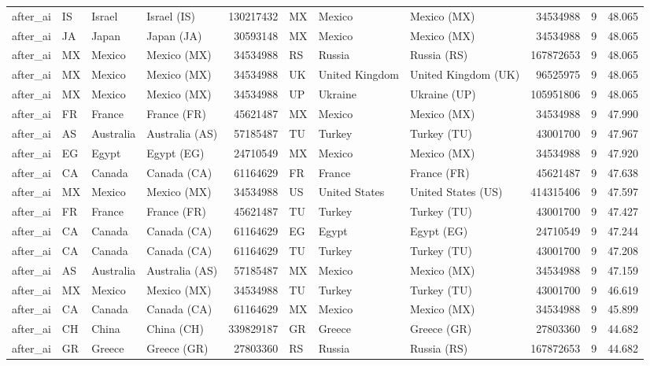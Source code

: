 \begin{tabular}{llllrlllrrr}
after\_ai & IS & Israel & Israel (IS) & 130217432 & MX & Mexico & Mexico (MX) & 34534988 & 9 & 48.065 \\
after\_ai & JA & Japan & Japan (JA) & 30593148 & MX & Mexico & Mexico (MX) & 34534988 & 9 & 48.065 \\
after\_ai & MX & Mexico & Mexico (MX) & 34534988 & RS & Russia & Russia (RS) & 167872653 & 9 & 48.065 \\
after\_ai & MX & Mexico & Mexico (MX) & 34534988 & UK & United Kingdom & United Kingdom (UK) & 96525975 & 9 & 48.065 \\
after\_ai & MX & Mexico & Mexico (MX) & 34534988 & UP & Ukraine & Ukraine (UP) & 105951806 & 9 & 48.065 \\
after\_ai & FR & France & France (FR) & 45621487 & MX & Mexico & Mexico (MX) & 34534988 & 9 & 47.990 \\
after\_ai & AS & Australia & Australia (AS) & 57185487 & TU & Turkey & Turkey (TU) & 43001700 & 9 & 47.967 \\
after\_ai & EG & Egypt & Egypt (EG) & 24710549 & MX & Mexico & Mexico (MX) & 34534988 & 9 & 47.920 \\
after\_ai & CA & Canada & Canada (CA) & 61164629 & FR & France & France (FR) & 45621487 & 9 & 47.638 \\
after\_ai & MX & Mexico & Mexico (MX) & 34534988 & US & United States & United States (US) & 414315406 & 9 & 47.597 \\
after\_ai & FR & France & France (FR) & 45621487 & TU & Turkey & Turkey (TU) & 43001700 & 9 & 47.427 \\
after\_ai & CA & Canada & Canada (CA) & 61164629 & EG & Egypt & Egypt (EG) & 24710549 & 9 & 47.244 \\
after\_ai & CA & Canada & Canada (CA) & 61164629 & TU & Turkey & Turkey (TU) & 43001700 & 9 & 47.208 \\
after\_ai & AS & Australia & Australia (AS) & 57185487 & MX & Mexico & Mexico (MX) & 34534988 & 9 & 47.159 \\
after\_ai & MX & Mexico & Mexico (MX) & 34534988 & TU & Turkey & Turkey (TU) & 43001700 & 9 & 46.619 \\
after\_ai & CA & Canada & Canada (CA) & 61164629 & MX & Mexico & Mexico (MX) & 34534988 & 9 & 45.899 \\
after\_ai & CH & China & China (CH) & 339829187 & GR & Greece & Greece (GR) & 27803360 & 9 & 44.682 \\
after\_ai & GR & Greece & Greece (GR) & 27803360 & RS & Russia & Russia (RS) & 167872653 & 9 & 44.682 \\

\end{tabular}
